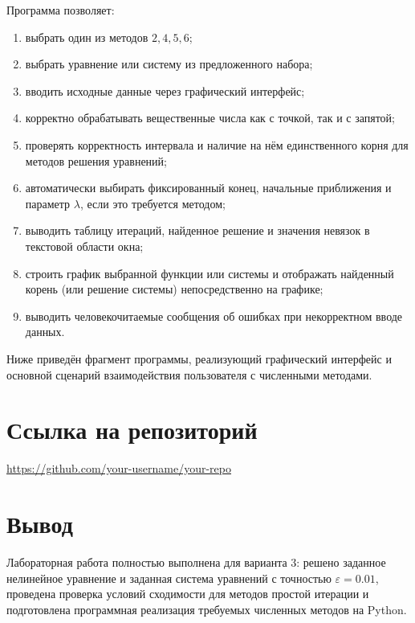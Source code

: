 ﻿\documentclass[12pt,a4paper]{article}
\begin{document}
Программа позволяет:
\begin{enumerate}
\item выбрать один из методов \(2, 4, 5, 6\);
\item выбрать уравнение или систему из предложенного набора;
\item вводить исходные данные через графический интерфейс;
\item корректно обрабатывать вещественные числа как с точкой, так и с запятой;
\item проверять корректность интервала и наличие на нём единственного корня для методов решения уравнений;
\item автоматически выбирать фиксированный конец, начальные приближения и параметр \(\lambda\), если это требуется методом;
\item выводить таблицу итераций, найденное решение и значения невязок в текстовой области окна;
\item строить график выбранной функции или системы и отображать найденный корень (или решение системы) непосредственно на графике;
\item выводить человекочитаемые сообщения об ошибках при некорректном вводе данных.
\end{enumerate}

Ниже приведён фрагмент программы, реализующий графический интерфейс и основной
сценарий взаимодействия пользователя с численными методами.



\section*{Ссылка на репозиторий}
\url{https://github.com/your-username/your-repo}

\section*{Вывод}
Лабораторная работа полностью выполнена для варианта 3: решено заданное нелинейное уравнение и заданная система уравнений с точностью $\varepsilon=0.01$, проведена проверка условий сходимости для методов простой итерации и подготовлена программная реализация требуемых численных методов на Python.
\end{document}
